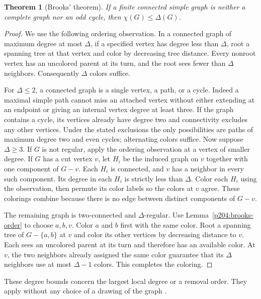 \documentclass[11pt,oneside,openany]{book}
\theoremstyle{plain}
\newtheorem{theorem}{Theorem}[chapter]
\theoremstyle{definition}
\theoremstyle{remark}
\begin{document}
\begin{theorem}[Brooks' theorem]\label{p204:W59}
If a finite connected simple graph is neither a complete graph nor
an odd cycle, then \(\chi(G)\le\Delta(G)\).
\end{theorem}
\begin{proof}
We use the following ordering observation. In a connected graph of
maximum degree at most \(\Delta\), if a specified vertex has degree
less than \(\Delta\), root a spanning tree at that vertex and color
by decreasing tree distance. Every nonroot vertex has an uncolored
parent at its turn, and the root sees fewer than \(\Delta\) neighbors.
Consequently \(\Delta\) colors suffice.

For \(\Delta\le2\), a connected graph is a single vertex, a path,
or a cycle. Indeed a maximal simple path cannot miss an attached
vertex without either extending at an endpoint or giving an
internal vertex degree at least three. If the graph contains a
cycle, its vertices already have degree two and connectivity
excludes any other vertices. Under the stated exclusions the only
possibilities are paths of maximum degree two and even cycles;
alternating colors suffice. Now suppose \(\Delta\ge3\).
If \(G\) is not regular, apply the ordering observation at a vertex
of smaller degree. If \(G\) has a cut vertex \(v\), let \(H_i\)
be the induced graph on \(v\) together with one component of \(G-v\).
Each \(H_i\) is connected, and \(v\) has a neighbor in every such
component. Its degree in each \(H_i\) is strictly less than \(\Delta\).
Color each \(H_i\) using the observation, then permute its color
labels so the colors at \(v\) agree. These colorings combine
because there is no edge between distinct components of \(G-v\).

The remaining graph is two-connected and \(\Delta\)-regular.
Use Lemma~\ref{p204:brooks-order} to choose \(a,b,v\).
Color \(a\) and \(b\) first with the same color. Root a spanning
tree of \(G-\{a,b\}\) at \(v\) and color its other vertices by
decreasing distance to \(v\). Each sees an uncolored parent at
its turn and therefore has an available color. At \(v\), the two
neighbors already assigned the same color guarantee that its
\(\Delta\) neighbors use at most \(\Delta-1\) colors.
This completes the coloring.
\end{proof}

These degree bounds concern the largest local degree or a removal
order. They apply without any choice of a drawing of the graph
\cite[Chapter 14]{BM}\cite[Chapter 5]{Diestel}.
\end{document}
